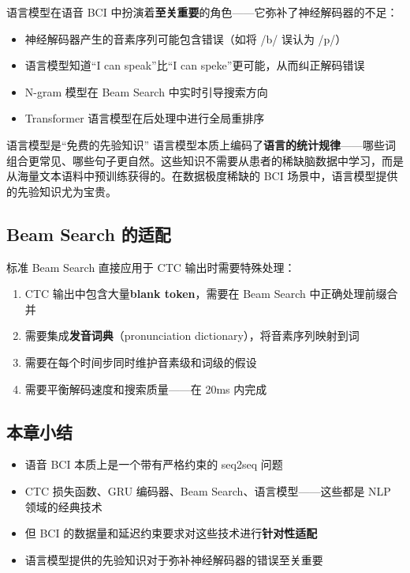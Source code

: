 \documentclass[a4paper]{article}
\begin{document}
语言模型在语音 BCI 中扮演着\textbf{至关重要}的角色——它弥补了神经解码器的不足：

\begin{itemize}
    \item 神经解码器产生的音素序列可能包含错误（如将 /b/ 误认为 /p/）
    \item 语言模型知道``I can speak''比``I can speke''更可能，从而纠正解码错误
    \item N-gram 模型在 Beam Search 中实时引导搜索方向
    \item Transformer 语言模型在后处理中进行全局重排序
\end{itemize}

\begin{importantbox}{语言模型是``免费的先验知识''}
语言模型本质上编码了\textbf{语言的统计规律}——哪些词组合更常见、哪些句子更自然。这些知识不需要从患者的稀缺脑数据中学习，而是从海量文本语料中预训练获得的。在数据极度稀缺的 BCI 场景中，语言模型提供的先验知识尤为宝贵。
\end{importantbox}

\subsection{Beam Search 的适配}

标准 Beam Search 直接应用于 CTC 输出时需要特殊处理：

\begin{enumerate}
    \item CTC 输出中包含大量\textbf{blank token}，需要在 Beam Search 中正确处理前缀合并
    \item 需要集成\textbf{发音词典}（pronunciation dictionary），将音素序列映射到词
    \item 需要在每个时间步同时维护音素级和词级的假设
    \item 需要平衡解码速度和搜索质量——在 20ms 内完成
\end{enumerate}

\subsection{本章小结}

\begin{itemize}
    \item 语音 BCI 本质上是一个带有严格约束的 seq2seq 问题
    \item CTC 损失函数、GRU 编码器、Beam Search、语言模型——这些都是 NLP 领域的经典技术
    \item 但 BCI 的数据量和延迟约束要求对这些技术进行\textbf{针对性适配}
    \item 语言模型提供的先验知识对于弥补神经解码器的错误至关重要
\end{itemize}
\end{document}
